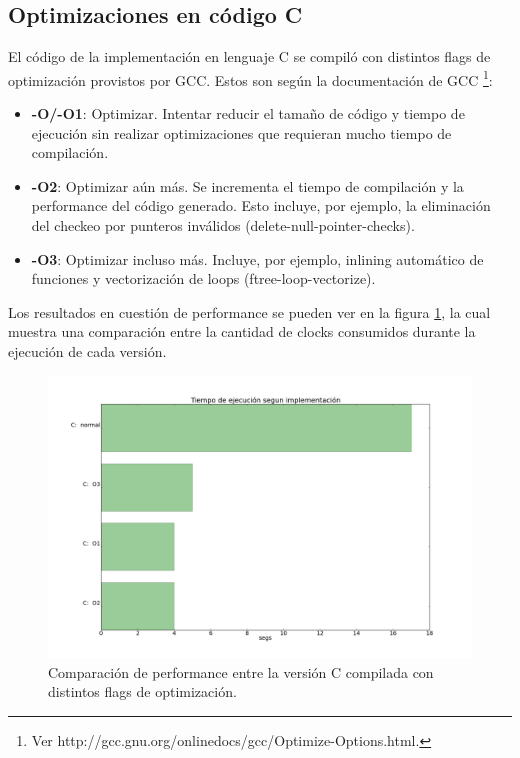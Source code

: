 \subsection{Optimizaciones en código C}
\label{sub:filtro-color-optimizaciones-c}

El código de la implementación en lenguaje C se compiló con distintos flags de optimización provistos por GCC. Estos son según la documentación de GCC \footnote{Ver http://gcc.gnu.org/onlinedocs/gcc/Optimize-Options.html.}:

\begin{itemize}
\item \textbf{-O/-O1}: Optimizar. Intentar reducir el tamaño de código y tiempo de ejecución sin realizar optimizaciones que requieran mucho tiempo de compilación.
\item \textbf{-O2}: Optimizar aún más. Se incrementa el tiempo de compilación y la performance del código generado. Esto incluye, por ejemplo, la eliminación del checkeo por punteros inválidos (delete-null-pointer-checks).
\item \textbf{-O3}: Optimizar incluso más. Incluye, por ejemplo, inlining automático de funciones y vectorización de loops (ftree-loop-vectorize).
\end{itemize}

Los resultados en cuestión de performance se pueden ver en la figura \ref{fig:filtro-color-C-vs-Os}, la cual muestra una comparación entre la cantidad de clocks consumidos durante la ejecución de cada versión.

\begin{figure}[H]
\begin{center}
  \includegraphics[scale=0.35]{secciones/filtro_color/graficos/C_normal_O1_O2_O3.png}
\end{center}
\caption{Comparación de performance entre la versión C compilada con distintos flags de optimización.}
\label{fig:filtro-color-C-vs-Os}
\end{figure}

